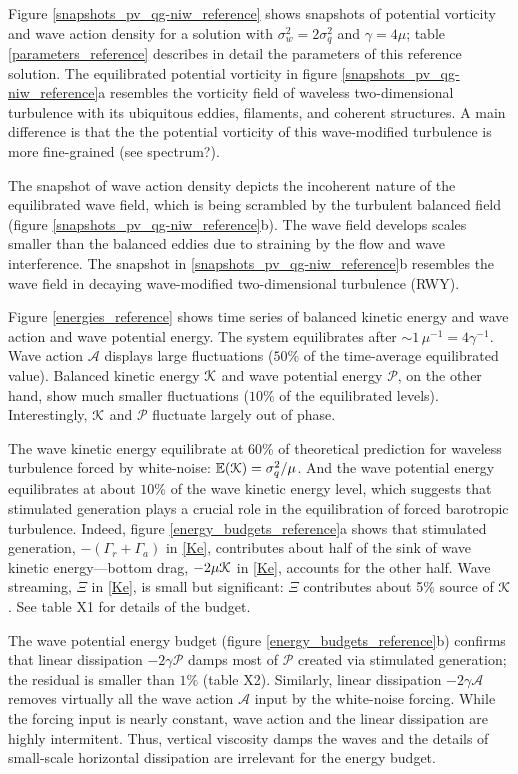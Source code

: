 \documentclass[12pt]{article}
\renewcommand{\P}{\mathcal{P}}
\newcommand{\A}{  \mathcal{A}}
\newcommand{\Es}{\mathbb{E}}
\begin{document}
Figure \ref{snapshots_pv_qg-niw_reference} shows snapshots of potential vorticity and wave
action density for a solution with $\sigma_w^2 = 2\sigma_q^2$ and $\gamma = 4\mu$; table
\ref{parameters_reference} describes in detail the parameters of
this reference solution. The equilibrated potential vorticity in figure
\ref{snapshots_pv_qg-niw_reference}a  resembles the vorticity field
of waveless two-dimensional turbulence with its ubiquitous eddies, filaments,
and coherent structures. A main difference is that the the potential vorticity
of this wave-modified turbulence is more fine-grained (see spectrum?).

The snapshot of wave action density depicts the incoherent nature of the equilibrated
wave field, which is being scrambled by the turbulent balanced field
(figure \ref{snapshots_pv_qg-niw_reference}b). The wave field develops scales smaller
than the balanced eddies due to straining by the flow and wave interference.
The snapshot in \ref{snapshots_pv_qg-niw_reference}b resembles the wave field in decaying wave-modified
two-dimensional turbulence (RWY).

Figure \eqref{energies_reference} shows time series of balanced kinetic energy
and wave action and wave potential energy. The system equilibrates after $\sim\!1
\, \mu^{-1} = 4 \gamma^{-1}$. Wave action $\A$ displays large fluctuations ($50\%$ of
 the time-average equilibrated value). Balanced kinetic energy $\mathcal{K}$
and wave potential energy $\P$, on the other hand, show much smaller fluctuations
($10\%$ of the equilibrated levels). Interestingly, $\mathcal{K}$ and $\P$ fluctuate
largely out of phase.

The wave kinetic energy equilibrate at 60\% of theoretical prediction for waveless
turbulence forced by white-noise: $\Es(\K) = \sigma_q^2/\mu$. And the wave potential
energy equilibrates at about $10\%$ of the wave kinetic energy level, which suggests
that stimulated generation plays a crucial role in the equilibration of forced
barotropic turbulence.  Indeed, figure \ref{energy_budgets_reference}a shows that
stimulated generation, $-(\Gamma_r+\Gamma_a)$ in \eqref{Ke}, contributes about half
of the sink of wave kinetic energy---bottom drag,
$-2\mu \mathcal{K}$ in  \eqref{Ke}, accounts for the other half. Wave streaming, $\Xi$ in
\eqref{Ke}, is small but significant: $\Xi$ contributes about 5\% source of $\mathcal{K}$.
See table X1 for details of the budget.

The wave potential energy budget (figure \ref{energy_budgets_reference}b) confirms that
linear dissipation $-2\gamma \P$ damps most of $\P$ created via stimulated generation;
the residual is smaller than $1\%$ (table X2). Similarly, linear dissipation
$-2\gamma \A$ removes virtually all the wave action
$\A$ input by the white-noise forcing. While the forcing input is nearly constant,
wave action and the linear dissipation are highly intermitent. Thus, vertical viscosity damps the waves
and the details of small-scale horizontal dissipation are irrelevant for the energy budget.
\end{document}
